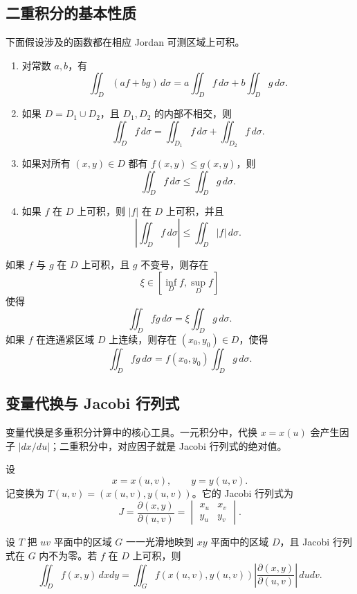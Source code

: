 \subsection{二重积分的基本性质}

下面假设涉及的函数都在相应 Jordan 可测区域上可积。

\begin{property}
\begin{enumerate}
    \item 对常数 $a,b$，有
    \[
        \iint_D(af+bg)\,d\sigma
        =a\iint_Df\,d\sigma+b\iint_Dg\,d\sigma.
    \]
    \item 如果 $D=D_1\cup D_2$，且 $D_1,D_2$ 的内部不相交，则
    \[
        \iint_Df\,d\sigma
        =\iint_{D_1}f\,d\sigma+
        \iint_{D_2}f\,d\sigma.
    \]
    \item 如果对所有 $(x,y)\in D$ 都有 $f(x,y)\leq g(x,y)$，则
    \[
        \iint_Df\,d\sigma\leq\iint_Dg\,d\sigma.
    \]
    \item 如果 $f$ 在 $D$ 上可积，则 $|f|$ 在 $D$ 上可积，并且
    \[
        \left|\iint_Df\,d\sigma\right|
        \leq\iint_D|f|\,d\sigma.
    \]
\end{enumerate}
\end{property}

\begin{theorem}[二重积分中值定理]
如果 $f$ 与 $g$ 在 $D$ 上可积，且 $g$ 不变号，则存在
\[
    \xi\in\left[\inf_D f,\sup_D f\right]
\]
使得
\[
    \iint_Dfg\,d\sigma=\xi\iint_Dg\,d\sigma.
\]
如果 $f$ 在连通紧区域 $D$ 上连续，则存在 $(x_0,y_0)\in D$，使得
\[
    \iint_Dfg\,d\sigma=f(x_0,y_0)\iint_Dg\,d\sigma.
\]
\end{theorem}

\subsection{变量代换与 Jacobi 行列式}

变量代换是多重积分计算中的核心工具。一元积分中，代换 $x=x(u)$ 会产生因子 $|dx/du|$；二重积分中，对应因子就是 Jacobi 行列式的绝对值。

设
\[
    x=x(u,v),\qquad y=y(u,v).
\]
记变换为 $T(u,v)=(x(u,v),y(u,v))$。它的 Jacobi 行列式为
\[
    J=\frac{\partial(x,y)}{\partial(u,v)}
    =\begin{vmatrix}
        x_u & x_v\\
        y_u & y_v
    \end{vmatrix}.
\]

\begin{theorem}[二重积分变量代换公式]
设 $T$ 把 $uv$ 平面中的区域 $G$ 一一光滑地映到 $xy$ 平面中的区域 $D$，且 Jacobi 行列式在 $G$ 内不为零。若 $f$ 在 $D$ 上可积，则
\[
    \iint_D f(x,y)\,dxdy
    =\iint_G f(x(u,v),y(u,v))
    \left|\frac{\partial(x,y)}{\partial(u,v)}\right|\,dudv.
\]
\end{theorem}

